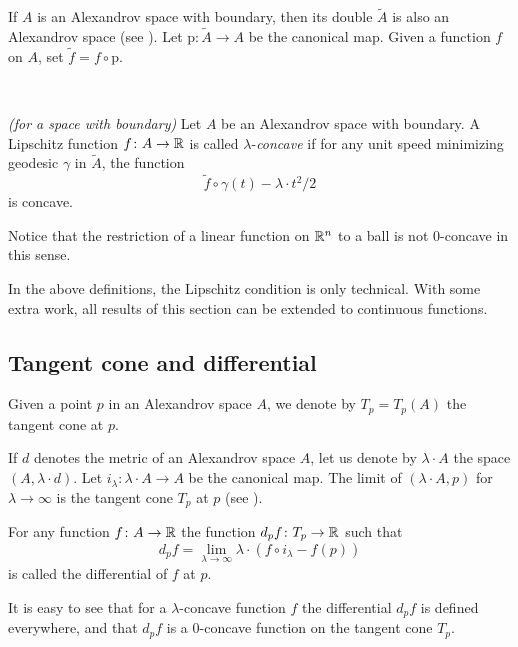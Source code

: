 \documentclass{amsart}
\begin{document}
If $A$ is an Alexandrov space with boundary, then its double $\tilde A$ is also an Alexandrov space (see \cite[5.2]{Per}).
Let $\text{p}\colon \tilde A\to A$ be the canonical map.
Given a function $f$ on $A$, set $\tilde f=f\circ \text{p}$.

\

\begin{defn}{\it (for a space with boundary)}  Let $A$ be an Alexandrov space with boundary. A Lipschitz function $f\colon A \rightarrow {\Bbb R}$ is called
$\lambda$-{\it concave} if for any unit speed
minimizing geodesic $\gamma$ in $\tilde A$, the function
$$\tilde f\circ\gamma(t)-\lambda\cdot  t^2/2 $$
is concave.
\end{defn}


\begin{rmk}Notice that the restriction of a linear function on ${\Bbb R}^n$ to a ball is not $0$-concave in this sense.
\end{rmk}

\begin{rmk}
In the above definitions, the Lipschitz condition is only technical.
With some extra work,
all results of this section can be extended to continuous functions.
\end{rmk}

\subsection{Tangent cone and differential} Given a point $p$ in an Alexandrov space  $A$, we denote by $T_p=T_p(A)$ the tangent cone at $p$.

If $d$ denotes the metric of an Alexandrov space $A$,
let us denote by $\lambda\cdot  A$ the space $(A,\lambda\cdot  d)$.
Let $i_\lambda\colon  \lambda\cdot  A\to A$ be the canonical map.
The limit of $(\lambda\cdot  A,p)$ for $\lambda\to\infty$ is  the tangent cone $T_p$ at $p$ (see \cite[ 7.8.1]{BGP}).

\begin{defn} For any function $f\colon A \rightarrow {\Bbb R}$ the function $d_pf\colon T_p \rightarrow {\Bbb R}$ such that
$$d_pf=\lim_{\lambda\to\infty} \lambda\cdot (f\circ i_\lambda-f(p))$$
is called the differential of $f$ at $p$.
\end{defn}

It is easy to see that for a $\lambda$-concave function $f$
the differential $d_pf$ is defined everywhere, and that $d_pf$
is a $0$-concave function on the tangent cone $T_p$.
\end{document}
